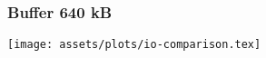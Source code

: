 \begin{frame}
    \frametitle{Buffer 640 kB}
    \centering
    \texttt{[image: assets/plots/io-comparison.tex]}

\end{frame}